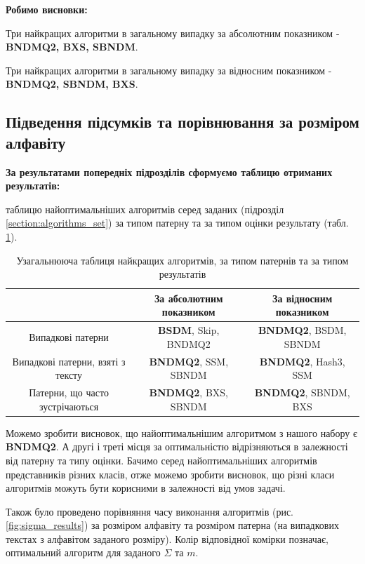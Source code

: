 \documentclass[a4paper,14pt]{extarticle} %
\begin{document}
				\textbf{Робимо висновки:}

				Три найкращих алгоритми в загальному випадку за абсолютним показником - \textbf{BNDMQ2, BXS, SBNDM}.

				Три найкращих алгоритми в загальному випадку за відносним показником - \textbf{BNDMQ2, SBNDM, BXS}.
					
			\subsection{Підведення підсумків та порівнювання за розміром алфавіту}

			\textbf{За результатами попередніх підрозділів сформуємо таблицю отриманих результатів:}
			
			таблицю найоптимальніших алгоритмів серед заданих (підрозділ \ref{section:algorithms_set}) за типом патерну та за типом оцінки результату (табл. \ref{table:all}).

			\begin{table}[H]
				\centering
				\footnotesize
				\begin{tabular}{|c|c|c|}
				\hline 
				& За абсолютним показником & За відносним показником \\
				\hline 
				Випадкові патерни  & \textbf{BSDM}, Skip, BNDMQ2 & \textbf{BNDMQ2}, BSDM, SBNDM \\
				\hline
				Випадкові патерни, взяті з тексту & \textbf{BNDMQ2}, SSM, SBNDM & \textbf{BNDMQ2}, Hash3, SSM \\
				\hline
				Патерни, що часто зустрічаються & \textbf{BNDMQ2}, BXS, SBNDM & \textbf{BNDMQ2}, SBNDM, BXS \\
				\hline
				\end{tabular}
				\caption{Узагальнююча таблиця найкращих алгоритмів, за типом патернів та за типом результатів}
				\label {table:all}
			\end{table}

			Можемо зробити висновок, що найоптимальнішим алгоритмом з нашого набору є \textbf{BNDMQ2}. А другі і треті місця за оптимальністю відрізняються в залежності від патерну та типу оцінки. Бачимо серед найоптимальніших алгоритмів представників різних класів, отже можемо зробити висновок, що різні класи алгоритмів можуть бути корисними в залежності від умов задачі.
			
			Також було проведено порівняння часу виконання алгоритмів (рис. \ref{fig:sigma_results}) за розміром алфавіту та розміром патерна (на випадкових текстах з алфавітом заданого розміру). Колір відповідної комірки позначає, оптимальний алгоритм для заданого $\Sigma$ та $m$.
\end{document}
